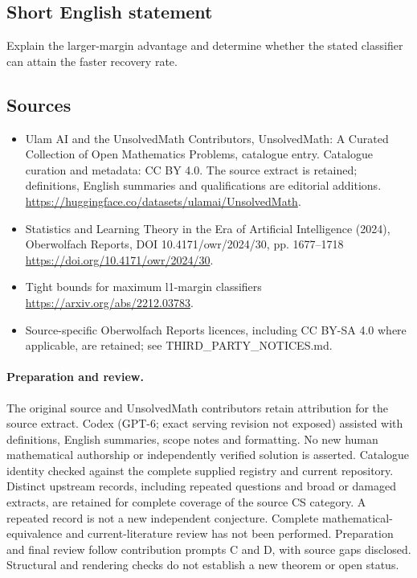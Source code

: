 \documentclass[11pt]{article}
\begin{document}
\subsection{Short English statement}
Explain the larger-margin advantage and determine whether the stated classifier can attain the faster recovery rate.
\subsection{Sources}
\begin{itemize}
\item[\hypertarget{source:statement:1}{S1}] Ulam AI and the UnsolvedMath Contributors, UnsolvedMath: A Curated Collection of Open Mathematics Problems, catalogue entry. Catalogue curation and metadata: CC BY 4.0. The source extract is retained; definitions, English summaries and qualifications are editorial additions.
\url{https://huggingface.co/datasets/ulamai/UnsolvedMath}.
\item[\hypertarget{source:statement:2}{S2}] Statistics and Learning Theory in the Era of Artificial Intelligence (2024), Oberwolfach Reports, DOI 10.4171/owr/2024/30, pp. 1677--1718
\url{https://doi.org/10.4171/owr/2024/30}.
\item[\hypertarget{source:statement:3}{S3}] Tight bounds for maximum l1-margin classifiers
\url{https://arxiv.org/abs/2212.03783}.
\item Source-specific Oberwolfach Reports licences, including CC BY-SA 4.0 where applicable, are retained; see THIRD\_PARTY\_NOTICES.md.
\end{itemize}
\paragraph{Preparation and review.}
The original source and UnsolvedMath contributors retain attribution for the source extract. Codex (GPT-6; exact serving revision not exposed) assisted with definitions, English summaries, scope notes and formatting. No new human mathematical authorship or independently verified solution is asserted. Catalogue identity checked against the complete supplied registry and current repository. Distinct upstream records, including repeated questions and broad or damaged extracts, are retained for complete coverage of the source CS category. A repeated record is not a new independent conjecture. Complete mathematical-equivalence and current-literature review has not been performed. Preparation and final review follow contribution prompts C and D, with source gaps disclosed. Structural and rendering checks do not establish a new theorem or open status.
\label{end:statement}
\end{document}
